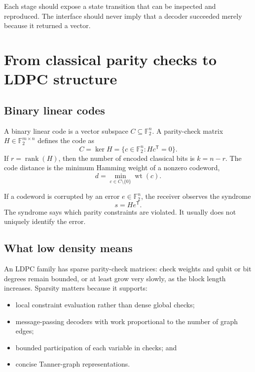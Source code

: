 \documentclass[11pt,letterpaper]{article}
\newcommand{\F}{\mathbb{F}_2}
\newcommand{\wt}{\operatorname{wt}}
\newcommand{\rank}{\operatorname{rank}}
\begin{document}
Each stage should expose a state transition that can be inspected and reproduced. The interface
should never imply that a decoder succeeded merely because it returned a vector.

\section{From classical parity checks to LDPC structure}

\subsection{Binary linear codes}

A binary linear code is a vector subspace $C\subseteq\F^n$. A parity-check matrix
$H\in\F^{m\times n}$ defines the code as
\begin{equation}
  C=\ker H=\{c\in\F^n: Hc^{\mathsf T}=0\}.
\end{equation}
If $r=\rank(H)$, then the number of encoded classical bits is $k=n-r$. The code distance is the
minimum Hamming weight of a nonzero codeword,
\begin{equation}
  d=\min_{c\in C\setminus\{0\}}\wt(c).
\end{equation}

If a codeword is corrupted by an error $e\in\F^n$, the receiver observes the syndrome
\begin{equation}
  s=He^{\mathsf T}.
\end{equation}
The syndrome says which parity constraints are violated. It usually does not uniquely identify
the error.

\subsection{What low density means}

An LDPC family has sparse parity-check matrices: check weights and qubit or bit degrees remain
bounded, or at least grow very slowly, as the block length increases. Sparsity matters because it
supports:

\begin{itemize}
  \item local constraint evaluation rather than dense global checks;
  \item message-passing decoders with work proportional to the number of graph edges;
  \item bounded participation of each variable in checks; and
  \item concise Tanner-graph representations.
\end{itemize}
\end{document}
